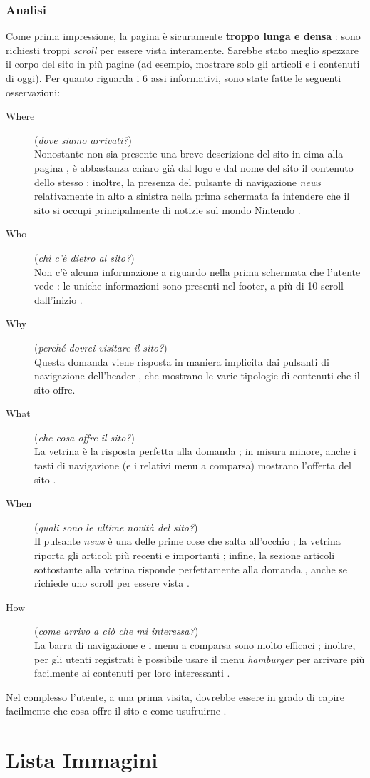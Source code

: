 \documentclass[12pt, a4paper,titlepage]{article}
\newcommand{\cmark}{\ding{51}}%
\newcommand{\xmark}{\ding{55}}%
\begin{document}
\subsubsection{Analisi}
\label{sub:home-analisi}
Come prima impressione, la pagina è sicuramente \textbf{troppo lunga e densa} \xmark: sono richiesti troppi \emph{scroll} per essere vista interamente. Sarebbe stato meglio spezzare il corpo del sito in più pagine (ad esempio, mostrare solo gli articoli e i contenuti di oggi).
Per quanto riguarda i 6 assi informativi, sono state fatte le seguenti osservazioni:
\begin{description}
    \item[Where] (\emph{dove siamo arrivati?}) \hfill \\ Nonostante non sia presente una breve descrizione del sito in cima alla pagina \xmark, è abbastanza chiaro già dal logo e dal nome del sito il contenuto dello stesso \cmark; inoltre, la presenza del pulsante di navigazione \emph{news} relativamente in alto a sinistra nella prima schermata fa intendere che il sito si occupi principalmente di notizie sul mondo Nintendo \cmark.
    \item[Who] (\emph{chi c'è dietro al sito?}) \hfill \\ Non c'è alcuna informazione a riguardo nella prima schermata che l'utente vede \xmark: le uniche informazioni sono presenti nel footer, a più di 10 scroll dall'inizio \xmark.
    \item[Why] (\emph{perché dovrei visitare il sito?}) \hfill \\ Questa domanda viene risposta in maniera implicita dai pulsanti di navigazione dell'header \cmark, che mostrano le varie tipologie di contenuti che il sito offre.
    \item[What] (\emph{che cosa offre il sito?}) \hfill \\  La vetrina è la risposta perfetta alla domanda \cmark; in misura minore, anche i tasti di navigazione (e i relativi menu a comparsa) mostrano l'offerta del sito \cmark.
    \item[When] (\emph{quali sono le ultime novità del sito?}) \hfill \\ Il pulsante \emph{news} è una delle prime cose che salta all'occhio \cmark; la vetrina riporta gli articoli più recenti e importanti \cmark; infine, la sezione articoli sottostante alla vetrina risponde perfettamente alla domanda \cmark, anche se richiede uno scroll per essere vista \xmark.
    \item[How] (\emph{come arrivo a ciò che mi interessa?}) \hfill \\ La barra di navigazione e i menu a comparsa sono molto efficaci \cmark; inoltre, per gli utenti registrati è possibile usare il menu \emph{hamburger} per arrivare più facilmente ai contenuti per loro interessanti \cmark.
\end{description}
Nel complesso l'utente, a una prima visita, dovrebbe essere in grado di capire facilmente che cosa offre il sito e come usufruirne \cmark.

\section{Lista Immagini}
\label{sec:immagini}
\end{document}
